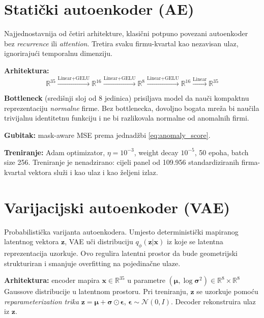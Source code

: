 \documentclass[diplomskirad,authoryear]{fer}
\begin{document}
\section{Statički autoenkoder (AE)}

Najjednostavnija od četiri arhitekture, klasični potpuno povezani autoenkoder bez \emph{recurrence} ili \emph{attention}. Tretira svaku firmu-kvartal kao nezavisan ulaz, ignorirajući temporalnu dimenziju.

\textbf{Arhitektura:}
\begin{equation}
\mathbb{R}^{35} \xrightarrow{\text{Linear}+\text{GELU}} \mathbb{R}^{16} \xrightarrow{\text{Linear}+\text{GELU}} \mathbb{R}^{8} \xrightarrow{\text{Linear}+\text{GELU}} \mathbb{R}^{16} \xrightarrow{\text{Linear}} \mathbb{R}^{35}
\label{eq:ae_arch}
\end{equation}

\textbf{Bottleneck} (središnji sloj od 8 jedinica) prisiljava model da nauči kompaktnu reprezentaciju \emph{normalne} firme. Bez bottlenecka, dovoljno bogata mreža bi naučila trivijalnu identitetnu funkciju i ne bi razlikovala normalne od anomalnih firmi.

\textbf{Gubitak:} mask-aware MSE prema jednadžbi \ref{eq:anomaly_score}.

\textbf{Treniranje:} Adam optimizator, $\eta = 10^{-3}$, weight decay $10^{-5}$, 50 epoha, batch size 256. Treniranje je nenadzirano: cijeli panel od 109.956 standardiziranih firma-kvartal vektora služi i kao ulaz i kao željeni izlaz.

\section{Varijacijski autoenkoder (VAE)}

Probabilistička varijanta autoenkodera. Umjesto deterministički mapiranog latentnog vektora $\mathbf{z}$, VAE uči distribuciju $q_\phi(\mathbf{z}|\mathbf{x})$ iz koje se latentna reprezentacija uzorkuje. Ovo regulira latentni prostor da bude geometrijski strukturiran i smanjuje overfitting na pojedinačne ulaze.

\textbf{Arhitektura:} encoder mapira $\mathbf{x} \in \mathbb{R}^{35}$ u parametre $(\boldsymbol{\mu}, \log\boldsymbol{\sigma}^2) \in \mathbb{R}^{8} \times \mathbb{R}^{8}$ Gaussove distribucije u latentnom prostoru. Pri treniranju, $\mathbf{z}$ se uzorkuje pomoću \emph{reparameterization trika} $\mathbf{z} = \boldsymbol{\mu} + \boldsymbol{\sigma} \odot \boldsymbol{\epsilon}$, $\boldsymbol{\epsilon} \sim \mathcal{N}(0, I)$. Decoder rekonstruira ulaz iz $\mathbf{z}$.
\end{document}
